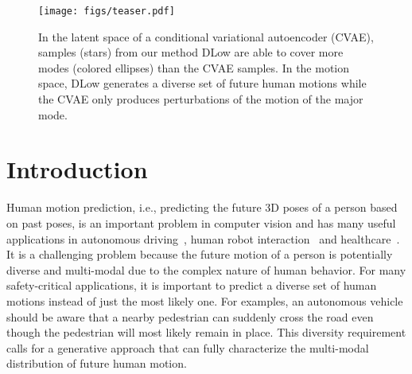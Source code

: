 \documentclass[runningheads]{llncs}
\begin{document}
	\begin{figure}[ht]
		\centering
		\texttt{[image: figs/teaser.pdf]}
		\vspace{-4mm}
		\caption{In the latent space of a conditional variational autoencoder (CVAE), samples (stars) from our method DLow are able to cover more modes (colored ellipses) than the CVAE samples. In the motion space, DLow generates a diverse set of future human motions while the CVAE only produces perturbations of the motion of the major mode.}
		\label{fig:teaser}
		\vspace{-7mm}
	\end{figure}
	
	
	\section{Introduction}
	\vspace{-1mm}
	
	Human motion prediction, i.e., predicting the future 3D poses of a person based on past poses, is an important problem in computer vision and has many useful applications in autonomous driving~\cite{paden2016survey}, human robot interaction~\cite{koppula2013anticipating} and healthcare~\cite{troje2002decomposing}. It is a challenging problem because the future motion of a person is potentially diverse and multi-modal due to the complex nature of human behavior. For many safety-critical applications, it is important to predict a diverse set of human motions instead of just the most likely one. For examples, an autonomous vehicle should be aware that a nearby pedestrian can suddenly cross the road even though the pedestrian will most likely remain in place. This diversity requirement calls for a generative approach that can fully characterize the multi-modal distribution of future human motion.
	
\end{document}
